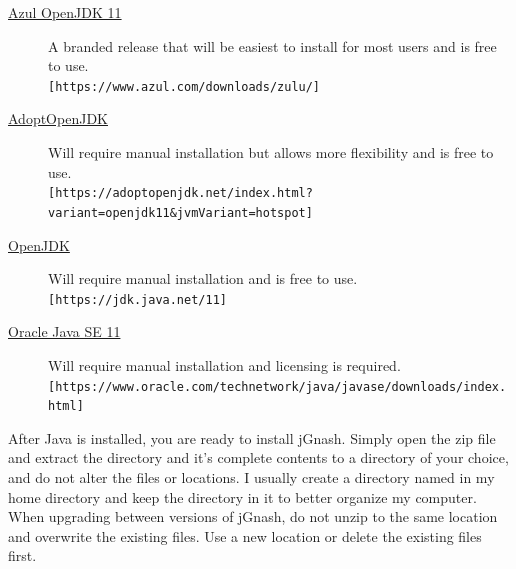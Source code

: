 \documentclass[letterpaper,12pt]{book}
\begin{document}
    \begin{description}
        \item[\href{https://www.azul.com/downloads/zulu/}{Azul OpenJDK 11}]
        A branded release that will be easiest to install for most users and is free to use. \\
        \texttt{[https://www.azul.com/downloads/zulu/]}
        \item[\href{https://adoptopenjdk.net/index.html?variant=openjdk11&jvmVariant=hotspot}{AdoptOpenJDK}]
        Will require manual installation but allows more flexibility and is free to use. \\
        \texttt{[https://adoptopenjdk.net/index.html?variant=openjdk11\&jvmVariant=hotspot]}
        \item [\href{https://jdk.java.net/11/}{OpenJDK}]
        Will require manual installation and is free to use. \\
        \texttt{[https://jdk.java.net/11]}
        \item[\href{https://www.oracle.com/technetwork/java/javase/downloads/index.html}{Oracle Java SE 11}]
        Will require manual installation and licensing is required. \\
        \texttt{[https://www.oracle.com/technetwork/java/javase/downloads/index.html]}
    \end{description}


    After Java is installed, you are ready to install jGnash.
    Simply open the zip file and extract the  directory and it's complete contents to a directory of
    your choice, and do not alter the files or locations.
    I usually create a directory named  in my home directory and keep
    the  directory in it to better organize my computer.
    When upgrading between versions of jGnash, do not unzip to the same location and overwrite the existing files.
    Use a new location or delete the existing files first.
\end{document}
